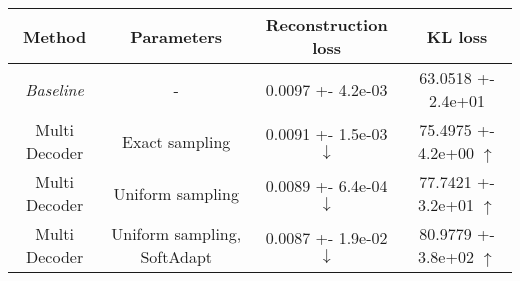 \centering
\scriptsize
\begin{tabular}{||c|c|c|c||}
\hline
 Method & Parameters & Reconstruction loss & KL loss \\
\hline
\textit{Baseline} & - & 0.0097 +- 4.2e-03 & 63.0518 +- 2.4e+01 \\
\hline
Multi Decoder & Exact sampling & 0.0091 +- 1.5e-03  $\downarrow$ & 75.4975 +- 4.2e+00  $\uparrow$ \\
\hline
Multi Decoder & Uniform sampling & 0.0089 +- 6.4e-04  $\downarrow$ & 77.7421 +- 3.2e+01  $\uparrow$ \\
\hline
Multi Decoder & Uniform sampling, SoftAdapt & 0.0087 +- 1.9e-02  $\downarrow$ & 80.9779 +- 3.8e+02  $\uparrow$ \\
\hline
\end{tabular}
